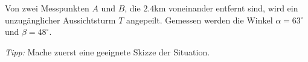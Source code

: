 \documentclass[11pt]{exam}
\begin{document}
\begin{questions}
\noaddpoints
\question[\totalpoints]
\addpoints
Von zwei Messpunkten $A$ und $B$, die $2.4$km voneinander entfernt sind, wird ein unzugänglicher Aussichtsturm $T$ angepeilt. Gemessen werden die Winkel  $\alpha=63^\circ$ und $\beta=48^\circ$.
\emph{Tipp:} Mache zuerst eine geeignete Skizze der Situation.






\end{questions}
\end{document}

